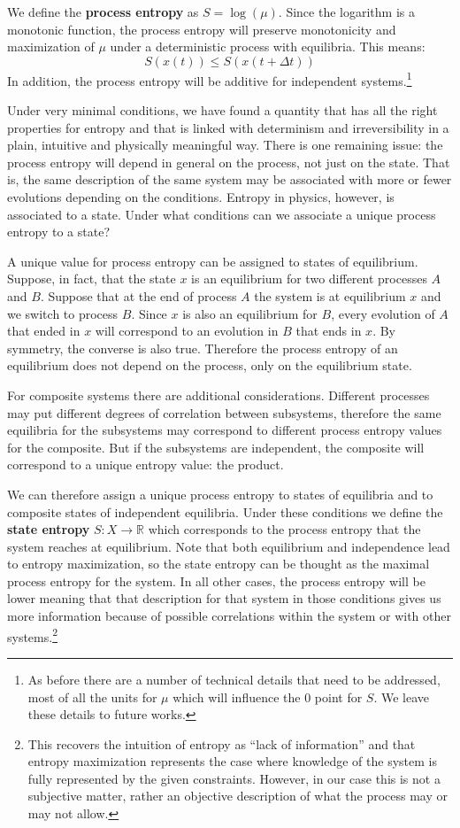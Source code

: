 \documentclass[letterpaper,twocolumn]{article}
\begin{document}
We define the \textbf{process entropy} as $S = \log(\mu)$. Since the logarithm is a monotonic function, the process entropy will preserve monotonicity and maximization of $\mu$ under a deterministic process with equilibria. This means:
\begin{equation}\label{ov_entropy_increases}
S(x(t)) \leq S(x(t + \Delta t))
\end{equation}
In addition, the process entropy will be additive for independent systems.\footnote{As before there are a number of technical details that need to be addressed, most of all the units for $\mu$ which will influence the 0 point for $S$. We leave these details to future works.}

Under very minimal conditions, we have found a quantity that has all the right properties for entropy and that is linked with determinism and irreversibility in a plain, intuitive and physically meaningful way. There is one remaining issue: the process entropy will depend in general on the process, not just on the state. That is, the same description of the same system may be associated with more or fewer evolutions depending on the conditions. Entropy in physics, however, is associated to a state. Under what conditions can we associate a unique process entropy to a state?

A unique value for process entropy can be assigned to states of equilibrium. Suppose, in fact, that the state $x$ is an equilibrium for two different processes $A$ and $B$. Suppose that at the end of process $A$ the system is at equilibrium $x$ and we switch to process $B$. Since $x$ is also an equilibrium for $B$, every evolution of $A$ that ended in $x$ will correspond to an evolution in $B$ that ends in $x$. By symmetry, the converse is also true. Therefore the process entropy of an equilibrium does not depend on the process, only on the equilibrium state.

For composite systems there are additional considerations. Different processes may put different degrees of correlation between subsystems, therefore the same equilibria for the subsystems may correspond to different process entropy values for the composite. But if the subsystems are independent, the composite will correspond to a unique entropy value: the product.

We can therefore assign a unique process entropy to states of equilibria and to composite states of independent equilibria. Under these conditions we define the \textbf{state entropy} $S : X \to \mathbb{R}$ which corresponds to the process entropy that the system reaches at equilibrium. Note that both equilibrium and independence lead to entropy maximization, so the state entropy can be thought as the maximal process entropy for the system. In all other cases, the process entropy will be lower meaning that that description for that system in those conditions gives us more information because of possible correlations within the system or with other systems.\footnote{This recovers the intuition of entropy as ``lack of information'' and that entropy maximization represents the case where knowledge of the system is fully represented by the given constraints. However, in our case this is not a subjective matter, rather an objective description of what the process may or may not allow.}
\end{document}
